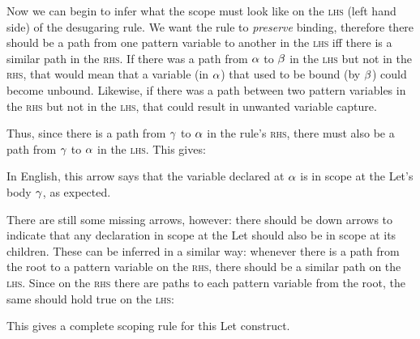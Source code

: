 Now we can begin to infer what the scope must look like on the
\textsc{lhs} (left hand side) of the desugaring rule. We want the rule to
\emph{preserve} binding, therefore there should be a path from one
pattern variable to another in the \textsc{lhs} iff there is a similar path in the
\textsc{rhs}. If there was a path from $\alpha$ to $\beta$ in the
\textsc{lhs} but not in the \textsc{rhs}, that would mean that a
variable (in $\alpha$) that used to be bound (by $\beta$) could
become unbound. Likewise, if there was a path between two pattern variables in the
\textsc{rhs} but not in the \textsc{lhs}, that could result in
unwanted variable capture.

Thus, since there is a path from $\gamma$ to $\alpha$ in the rule's
\textsc{rhs}, there must also be a path from $\gamma$ to $\alpha$ in the
\textsc{lhs}. This gives:
\begin{center}
\end{center}
In English, this arrow says that the variable declared at $\alpha$ is
in scope at the Let's body $\gamma$, as expected.

There are still some missing arrows, however: there should be down
arrows to indicate that any declaration in scope at the Let should
also be in scope at its children. These can be inferred in a similar
way: whenever there is a path from the root to a pattern variable on the
\textsc{rhs}, there should be a similar path on the \textsc{lhs}.
Since on the \textsc{rhs} there are paths to each pattern variable from the root,
the same should hold true on the \textsc{lhs}:
\begin{center}
\end{center}
This gives a complete scoping rule for this Let construct.


